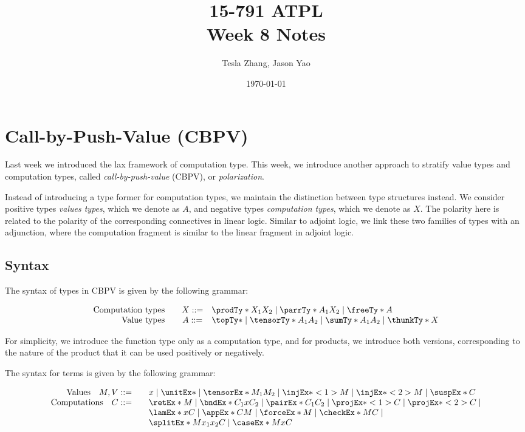 \documentclass[letterpaper]{article}
\title{15-791 ATPL \\ Week 8 Notes}
\author{Tesla Zhang, Jason Yao}
\date{\today}
\begin{document}
\maketitle
\tableofcontents

\section{Call-by-Push-Value (CBPV)}
Last week we introduced the lax framework of computation type.
This week, we introduce another approach to stratify value types and computation types,
called \emph{call-by-push-value} (CBPV), or \emph{polarization}.

Instead of introducing a type former for computation types,
we maintain the distinction between type structures instead.
We consider positive types \emph{values types}, which we denote as $A$,
and negative types \emph{computation types}, which we denote as $X$.
The polarity here is related to the polarity of the corresponding connectives in linear logic.
Similar to adjoint logic, we link these two families of types with an adjunction,
where the computation fragment is similar to the linear fragment in adjoint logic.

\subsection{Syntax}

The syntax of types in CBPV is given by the following grammar:

\[
  \begin{array}{rcl}
    \text{Computation types} \quad & X ::= & \prodTy*{X_1}{X_2} \mid \parrTy*{A_1}{X_2} \mid \freeTy*{A} \\
    \text{Value types} \quad       & A ::= & \topTy* \mid \tensorTy*{A_1}{A_2} \mid \sumTy*{A_1}{A_2} \mid \thunkTy*{X} \\
  \end{array}
\]

For simplicity, we introduce the function type only as a computation type,
and for products, we introduce both versions, corresponding to the nature of the product that
it can be used positively or negatively.

The syntax for terms is given by the following grammar:

\[
  \begin{array}{rcl}
    \text{Values} \quad M, V ::=
      && x \mid \unitEx* \mid \tensorEx*{M_1}{M_2} \mid \injEx*<1>{M} \mid \injEx*<2>{M} \mid \suspEx*{C} \\
    \text{Computations} \quad C ::=
      && \retEx*{M} \mid \bndEx*{C_1}{x}{C_2} \mid \pairEx*{C_1}{C_2} \mid \projEx*<1>{C} \mid \projEx*<2>{C} \mid \\
      && \lamEx*{x}{C} \mid \appEx*{C}{M} \mid \forceEx*{M} \mid \checkEx*{M}{C} \mid \\
      && \splitEx*{M}{x_1}{x_2}{C} \mid \caseEx* M x C
  \end{array}
\]
\end{document}
